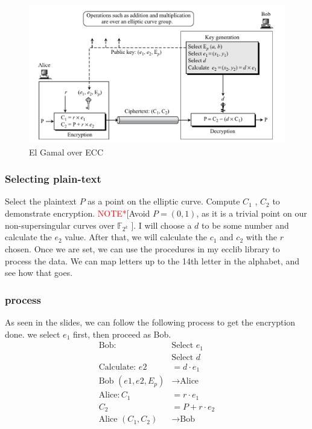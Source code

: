 \documentclass[a4paper,11pt]{exam}
\begin{document}
\begin{center}
\begin{figure}[h]
    \centering
    \includegraphics[width=16cm]{./images/fig1_hw3.png}
    \caption{El Gamal over ECC}
    \label{fig:fig1_hw3}
  \end{figure}
\end{center}

\subsubsection{Selecting plain-text}
\label{sec:org1b9097f}
Select the plaintext \(P\) as a point on the elliptic curve. Compute \(C_1\) , \(C_2\) to demonstrate encryption. \textcolor{red}{NOTE*}[Avoid \(P = (0, 1)\), as it is a trivial point on our non-supersingular curves over \(\mathbb{F}_{2^k}\) ].
I will choose a \(d\) to be some number and calculate the \(e_2\) value. After that, we will calculate the \(c_1\) and \(c_2\) with the \(r\) chosen. Once we are set, we can use the procedures in my ecclib library to process the data. We can map letters up to the 14th letter in the alphabet, and see how that goes.

\subsubsection{process}
\label{sec:orga6005a0}
\noindent
As seen in the slides, we can follow the following process to get the encryption done. we select \(e_1\) first, then proceed as Bob.
\begin{align*}
\text{Bob} : &\text{Select }e_1\\
&\text{Select }d\\
\text{Calculate: }e2 &= d\cdot e_1\\
\text{Bob }(e1,e2,E_p) &\xrightarrow{}\text{Alice}\\
\text{Alice} : C_1 &= r\cdot e_1\\
C_2 &= P + r\cdot e_2\\
\text{Alice }(C_1, C_2) &\xrightarrow{}\text{Bob}
\end{align*}
\end{document}
